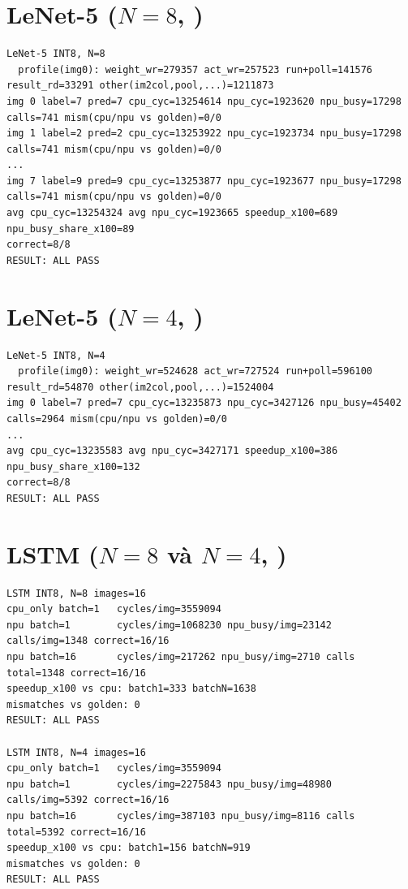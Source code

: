 \section{LeNet-5 (\texorpdfstring{$N=8$}{N=8}, )}
\begin{lstlisting}[style=codelog]
LeNet-5 INT8, N=8
  profile(img0): weight_wr=279357 act_wr=257523 run+poll=141576 result_rd=33291 other(im2col,pool,...)=1211873
img 0 label=7 pred=7 cpu_cyc=13254614 npu_cyc=1923620 npu_busy=17298 calls=741 mism(cpu/npu vs golden)=0/0
img 1 label=2 pred=2 cpu_cyc=13253922 npu_cyc=1923734 npu_busy=17298 calls=741 mism(cpu/npu vs golden)=0/0
...
img 7 label=9 pred=9 cpu_cyc=13253877 npu_cyc=1923677 npu_busy=17298 calls=741 mism(cpu/npu vs golden)=0/0
avg cpu_cyc=13254324 avg npu_cyc=1923665 speedup_x100=689 npu_busy_share_x100=89
correct=8/8
RESULT: ALL PASS
\end{lstlisting}

\section{LeNet-5 (\texorpdfstring{$N=4$}{N=4}, )}
\begin{lstlisting}[style=codelog]
LeNet-5 INT8, N=4
  profile(img0): weight_wr=524628 act_wr=727524 run+poll=596100 result_rd=54870 other(im2col,pool,...)=1524004
img 0 label=7 pred=7 cpu_cyc=13235873 npu_cyc=3427126 npu_busy=45402 calls=2964 mism(cpu/npu vs golden)=0/0
...
avg cpu_cyc=13235583 avg npu_cyc=3427171 speedup_x100=386 npu_busy_share_x100=132
correct=8/8
RESULT: ALL PASS
\end{lstlisting}

\section{LSTM (\texorpdfstring{$N=8$}{N=8} và \texorpdfstring{$N=4$}{N=4}, )}
\begin{lstlisting}[style=codelog]
LSTM INT8, N=8 images=16
cpu_only batch=1   cycles/img=3559094
npu batch=1        cycles/img=1068230 npu_busy/img=23142 calls/img=1348 correct=16/16
npu batch=16       cycles/img=217262 npu_busy/img=2710 calls total=1348 correct=16/16
speedup_x100 vs cpu: batch1=333 batchN=1638
mismatches vs golden: 0
RESULT: ALL PASS

LSTM INT8, N=4 images=16
cpu_only batch=1   cycles/img=3559094
npu batch=1        cycles/img=2275843 npu_busy/img=48980 calls/img=5392 correct=16/16
npu batch=16       cycles/img=387103 npu_busy/img=8116 calls total=5392 correct=16/16
speedup_x100 vs cpu: batch1=156 batchN=919
mismatches vs golden: 0
RESULT: ALL PASS
\end{lstlisting}

